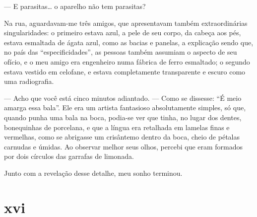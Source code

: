 --- E parasitas\ldots{} o aparelho não tem parasitas?



Na rua, aguardavam-me três amigos, que apresentavam também
extraordinárias singularidades: o primeiro estava azul, a pele de seu
corpo, da cabeça aos pés, estava esmaltada de ágata azul, como as bacias
e panelas, a explicação sendo que, no país das ``especificidades'', as
pessoas também assumiam o aspecto de seu ofício, e o meu amigo era
engenheiro numa fábrica de ferro esmaltado; o segundo estava vestido em
celofane, e estava completamente transparente e escuro como uma
radiografia.



--- Acho que você está cinco minutos adiantado. --- Como se dissesse: ``É meio amarga essa bala''. Ele era um artista fantasioso absolutamente
simples, só que, quando punha uma bala na boca, podia-se ver que tinha,
no lugar dos dentes, bonequinhas de porcelana, e que a língua era
retalhada em lamelas finas e vermelhas, como se abrigasse um crisântemo
dentro da boca, cheio de pétalas carnudas e úmidas. Ao observar melhor
seus olhos, percebi que eram formados por dois círculos das garrafas de
limonada.

Junto com a revelação desse detalhe, meu sonho terminou.

\section{xvi}

